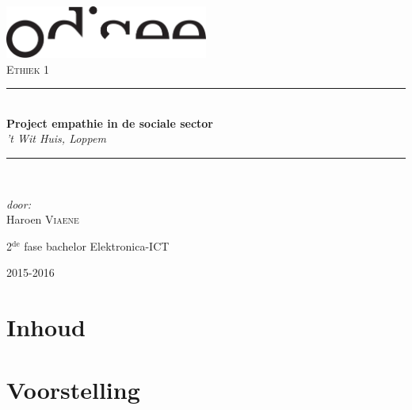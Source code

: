 \documentclass[a4paper,12pt]{article}
\newcommand{\HRule}{\rule{\linewidth}{0.5mm}}
\begin{document}
\begin{titlepage}
\begin{center}
\includegraphics[width=0.5\textwidth]{./logo.pdf}~\\[1cm]


\textsc{\Large Ethiek 1}\\[0.5cm]

\HRule \\[0.4cm]
{ \LARGE \bfseries Project empathie in de sociale sector}\\[0.4cm]
{\large \emph{'t Wit Huis, Loppem}}\\[0.2cm]

\HRule \\[1.5cm]

\begin{minipage}{0.4\textwidth}
\begin{flushleft} \large
\emph{door:}\\
Haroen \textsc{Viaene}\\

\end{flushleft}
\end{minipage}
\begin{minipage}{0.4\textwidth}
\begin{flushright} \large
\large{2$^{\text{de}}$ fase bachelor Elektronica-ICT}\\
\end{flushright}
\end{minipage}

\vfill

{\large 2015-2016}

\end{center}
\end{titlepage}

\newpage

\section*{Inhoud}

\tableofcontents

\newpage

\section{Voorstelling}
\end{document}
